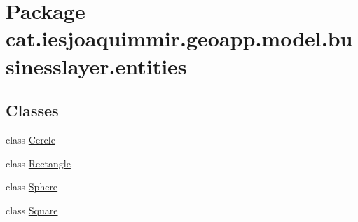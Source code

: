 \hypertarget{namespacecat_1_1iesjoaquimmir_1_1geoapp_1_1model_1_1businesslayer_1_1entities}{}\section{Package cat.\+iesjoaquimmir.\+geoapp.\+model.\+businesslayer.\+entities}
\label{namespacecat_1_1iesjoaquimmir_1_1geoapp_1_1model_1_1businesslayer_1_1entities}
\subsection*{Classes}
\begin{DoxyCompactItemize}
\item 
class \mbox{\hyperlink{classcat_1_1iesjoaquimmir_1_1geoapp_1_1model_1_1businesslayer_1_1entities_1_1_cercle}{Cercle}}
\item 
class \mbox{\hyperlink{classcat_1_1iesjoaquimmir_1_1geoapp_1_1model_1_1businesslayer_1_1entities_1_1_rectangle}{Rectangle}}
\item 
class \mbox{\hyperlink{classcat_1_1iesjoaquimmir_1_1geoapp_1_1model_1_1businesslayer_1_1entities_1_1_sphere}{Sphere}}
\item 
class \mbox{\hyperlink{classcat_1_1iesjoaquimmir_1_1geoapp_1_1model_1_1businesslayer_1_1entities_1_1_square}{Square}}
\end{DoxyCompactItemize}
